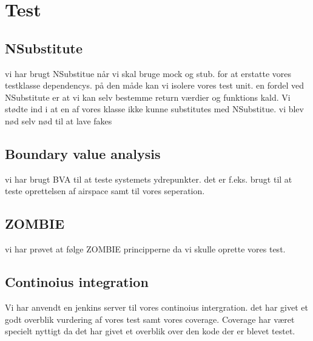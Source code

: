 \section{Test}
\subsection{NSubstitute}
vi har brugt NSubstitue når vi skal bruge mock og stub. for at erstatte vores testklasse dependencys. på den måde kan vi isolere vores test unit. en fordel ved NSubstitute er at vi kan selv bestemme return værdier og funktions kald.
Vi stødte ind i at en af vores klasse ikke kunne substitutes med NSubstitue. vi blev nød selv nød til at lave fakes

\subsection{Boundary value analysis} 
vi har brugt BVA til at teste systemets ydrepunkter. det er f.eks. brugt til at teste oprettelsen af airspace samt til vores seperation. 

\subsection{ZOMBIE}
vi har prøvet at følge ZOMBIE principperne da vi skulle oprette vores test. 

\subsection{Continoius integration}
Vi har anvendt en jenkins server til vores continoius intergration. det har givet et godt overblik vurdering af vores test samt vores coverage. Coverage har været specielt nyttigt da det har givet et overblik over den kode der er blevet testet.

